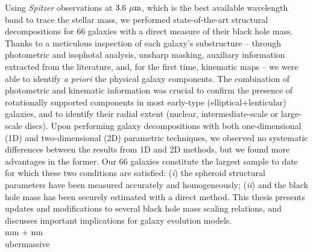 Using \emph{Spitzer} observations at $3.6 ~\mu \rm m$, 
which is the best available wavelength band to trace the stellar mass, 
we performed state-of-the-art structural decompositions for $66$ galaxies 
with a direct measure of their black hole mass. 
Thanks to a meticulous inspection of each galaxy's substructure -- 
through photometric and isophotal analysis, unsharp masking, auxiliary information extracted from the literature, 
and, for the first time, kinematic maps -- 
we were able to identify \emph{a priori} the physical galaxy components. 
The combination of photometric and kinematic information was crucial 
to confirm the presence of rotationally supported components in most early-type (elliptical+lenticular) galaxies, 
and to identify their radial extent (nuclear, intermediate-scale or large-scale discs). 
Upon performing galaxy decompositions with both one-dimensional (1D) and two-dimensional (2D) parametric techniques, 
we observed no systematic differences between the results from 1D and 2D methods, 
but we found more advantages in the former. 
Our 66 galaxies constitute the largest sample to date 
for which these two conditions are satisfied: 
(\emph{i}) the spheroid structural parameters have been measured accurately and homogeneously;  
(\emph{ii}) and the black hole mass has been securely estimated with a direct method. 
This thesis presents updates and modifications to several black hole mass scaling relations, 
and discusses important implications for galaxy evolution models. \\

mm + mn \\

ubermassive \\



